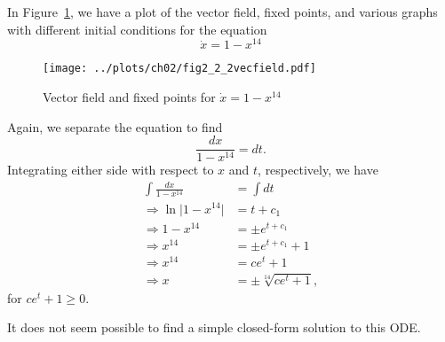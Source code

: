 
In Figure~\ref{fig2_2_2vecfield}, we have a plot of the vector field, fixed points,
and various graphs with different initial conditions for the equation 
\[
    \dot{x} = 1 - x^{14}
\]
\begin{figure}[!ht]
    \texttt{[image: ../plots/ch02/fig2\_2\_2vecfield.pdf]}
    \caption{Vector field and fixed points for $\dot{x} = 1 - x^{14}$\label{fig2_2_2vecfield}}
\end{figure}

Again, we separate the equation to find
\[
    \frac{dx}{1 - x^{14}} = dt.
\]
Integrating either side with respect to $x$ and $t$, respectively, we have
\begin{equation*}
    \begin{split}
        \int \frac{dx}{1 - x^{14}} &= \int dt \\
        \Rightarrow \ln{\lvert 1 - x^{14} \rvert} &= t + c_1 \\
        \Rightarrow 1 - x^{14} &= \pm e^{t + c_1} \\
        \Rightarrow x^{14} &= \pm e^{t + c_1} + 1 \\
        \Rightarrow x^{14} &= ce^t + 1 \\
        \Rightarrow x &= \pm \sqrt[14]{ce^t + 1},
    \end{split}
\end{equation*}
for $ce^t + 1 \geq 0$.

It does not seem possible to find a simple closed-form solution to this ODE.
